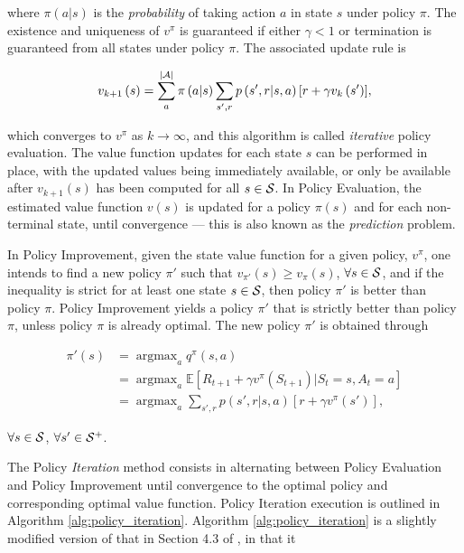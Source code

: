 \documentclass[a4paper]{article}
\DeclareMathOperator*{\argmax}{argmax}
\begin{document}
where $\pi \left( a | s \right)$ is the \textit{probability} of taking action $a$ in state $s$ under policy $\pi$. The existence and uniqueness of $v^{\pi}$ is guaranteed if either $\gamma < 1$ or termination is guaranteed from all states under policy $\pi$. The associated update rule is 

\begin{align}
v_{k+1}\left( s \right) = \sum\limits_{a}^{|{\cal A}|} \pi \left( a|s\right) \sum\limits_{s',r} { p\left( {s',r|s,a} \right) \left[ r + \gamma v_{k}\left( s' \right) \right] },
\end{align}

which converges to $v^{\pi}$ as $k \to \infty$, and this algorithm is called \textit{iterative} policy evaluation. The value function updates for each state $s$ can be performed in place, with the updated values being immediately available, or only be available after $v_{k+1}\left( s \right)$ has been computed for all $s \in \cal{S}$. In Policy Evaluation, the estimated value function $v(s)$ is updated for a policy $\pi \left( s \right)$ and for each non-terminal state, until convergence --- this is also known as the \textit{prediction} problem.

In Policy Improvement, given the state value function for a given policy, $v^{\pi}$, one intends to find a new policy $\pi'$ such that $v_{\pi'}\left( s \right) \geq v_{\pi}\left( s \right)$, $\forall s \in \cal{S}$, and if the inequality is strict for at least one state $s \in \cal{S}$, then policy $\pi'$ is better than policy $\pi$. Policy Improvement yields a policy $\pi'$ that is strictly better than policy $\pi$, unless policy $\pi$ is already optimal. The new policy $\pi'$ is obtained through

\begin{align}
\pi'\left( s \right) &= \argmax_{a} q^{\pi} \left( s,a \right) \\
                         &= \argmax_{a} \mathbb{E} \left[ R_{t+1} + \gamma v^{\pi}\left( S_{t+1} \right) | S_t = s , A_t = a \right] \\
                         &= \argmax_{a} \sum\limits_{s',r} { p\left( {s',r|s,a} \right) \left[ r + \gamma v^{\pi}\left( s' \right) \right] },
\end{align}

$\forall s \in \cal{S}$, $\forall s' \in \cal{S^{+}}$.

The Policy \textit{Iteration} method consists in alternating between Policy Evaluation and Policy Improvement until convergence to the optimal policy and corresponding optimal value function. Policy Iteration execution is outlined in Algorithm \ref{alg:policy_iteration}. Algorithm \ref{alg:policy_iteration} is a slightly modified version of that in Section 4.3 of \cite{10.5555/3312046}, in that it
\end{document}
